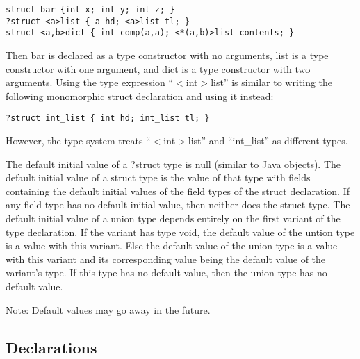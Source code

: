 \documentclass[titlepage,10pt]{article}
\begin{document}

\begin{verbatim}
struct bar {int x; int y; int z; }
?struct <a>list { a hd; <a>list tl; }
struct <a,b>dict { int comp(a,a); <*(a,b)>list contents; }
\end{verbatim}

Then bar is declared as a type constructor with no arguments, list is a
type constructor with one argument, and dict is a type constructor with
two arguments.   Using the type expression ``$<$int$>$list'' is similar to
writing the following monomorphic struct declaration and using it
instead:


\begin{verbatim}
?struct int_list { int hd; int_list tl; }
\end{verbatim}

However, the type system treats ``$<$int$>$list'' and ``int{\_}list'' as
different types.

The default initial value of a ?struct type is null (similar to Java
objects).  The default initial value of a struct type is the value of
that type with fields containing the default initial values of the field
types of the struct declaration.  If any field type has no default
initial value, then neither does the struct type.  The default initial
value of a union type depends entirely on the first variant of the type
declaration.  If the variant has type void, the default value of the
untion type is a value with this variant.  Else the default value of the
union type is a value with this variant and its corresponding value
being the default value of the variant's type.  If this type has no
default value, then the union type has no default value.

Note: Default values may go away in the future.


\subsection{Declarations\label{declarations}}
\end{document}
